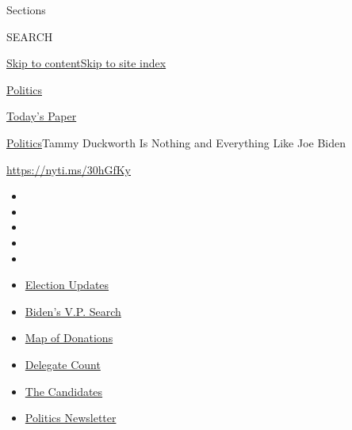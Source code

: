 Sections

SEARCH

\protect\hyperlink{site-content}{Skip to
content}\protect\hyperlink{site-index}{Skip to site index}

\href{https://www.nytimes.com/section/politics}{Politics}

\href{https://myaccount.nytimes.com/auth/login?response_type=cookie\&client_id=vi}{}

\href{https://www.nytimes.com/section/todayspaper}{Today's Paper}

\href{/section/politics}{Politics}\textbar{}Tammy Duckworth Is Nothing
and Everything Like Joe Biden

\url{https://nyti.ms/30hGfKy}

\begin{itemize}
\item
\item
\item
\item
\item
\end{itemize}

\begin{itemize}
\item
  \href{https://www.nytimes.com/2020/07/31/us/elections/biden-vs-trump.html?action=click\&pgtype=Article\&state=default\&region=TOP_BANNER\&context=storylines_menu}{Election
  Updates}
\item
  \href{https://www.nytimes.com/article/biden-vice-president-2020.html?action=click\&pgtype=Article\&state=default\&region=TOP_BANNER\&context=storylines_menu}{Biden's
  V.P. Search}
\item
  \href{https://www.nytimes.com/interactive/2020/07/24/us/politics/trump-biden-campaign-donors.html?action=click\&pgtype=Article\&state=default\&region=TOP_BANNER\&context=storylines_menu}{Map
  of Donations}
\item
  \href{https://www.nytimes.com/interactive/2020/us/elections/delegate-count-primary-results.html?action=click\&pgtype=Article\&state=default\&region=TOP_BANNER\&context=storylines_menu}{Delegate
  Count}
\item
  \href{https://www.nytimes.com/interactive/2019/us/politics/2020-presidential-candidates.html?action=click\&pgtype=Article\&state=default\&region=TOP_BANNER\&context=storylines_menu}{The
  Candidates}
\item
  \href{https://www.nytimes.com/newsletters/politics?action=click\&pgtype=Article\&state=default\&region=TOP_BANNER\&context=storylines_menu}{Politics
  Newsletter}
\end{itemize}

